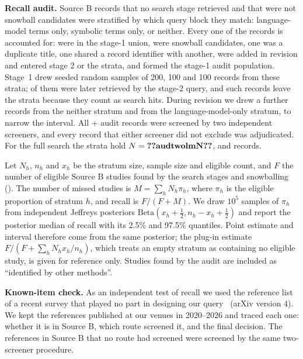 \textbf{Recall audit.} Source B records that no search stage retrieved and that were not snowball candidates were stratified by which query block they match: language-model terms only, symbolic terms only, or neither. Every one of the  records is accounted for:  were in the stage-1 union,  were snowball candidates, one was a duplicate title, one shared a record identifier with another,  were added in revision and entered stage 2 or the strata, and  formed the stage-1 audit population. Stage~1 drew seeded random samples of 200, 100 and 100 records from these strata;  of them were later retrieved by the stage-2 query, and such records leave the strata because they count as search hits. During revision we drew a further  records from the neither stratum and  from the language-model-only stratum, to narrow the interval. All + audit records were screened by two independent screeners, and every record that either screener did not exclude was adjudicated. For the full search the strata hold $N=\cnt{audtwolmN}$,  and  records.

Let $N_h$, $n_h$ and $x_h$ be the stratum size, sample size and eligible count, and $F$ the number of eligible Source B studies found by the search stages and snowballing (). The number of missed studies is $M=\sum_h N_h\pi_h$, where $\pi_h$ is the eligible proportion of stratum $h$, and recall is $F/(F+M)$. We draw $10^5$ samples of $\pi_h$ from independent Jeffreys posteriors $\mathrm{Beta}(x_h+\tfrac12, n_h-x_h+\tfrac12)$ and report the posterior median of recall with its 2.5\% and 97.5\% quantiles. Point estimate and interval therefore come from the same posterior; the plug-in estimate $F/(F+\sum_h N_h x_h/n_h)$, which treats an empty stratum as containing no eligible study, is given for reference only. Studies found by the audit are included as ``identified by other methods''.

\textbf{Known-item check.} As an independent test of recall we used the reference list of a recent survey that played no part in designing our query~\cite{cheng2025empowering} (arXiv version 4). We kept the  references published at our venues in 2020--2026 and traced each one: whether it is in Source B, which route screened it, and the final decision. The  references in Source B that no route had screened were screened by the same two-screener procedure.


